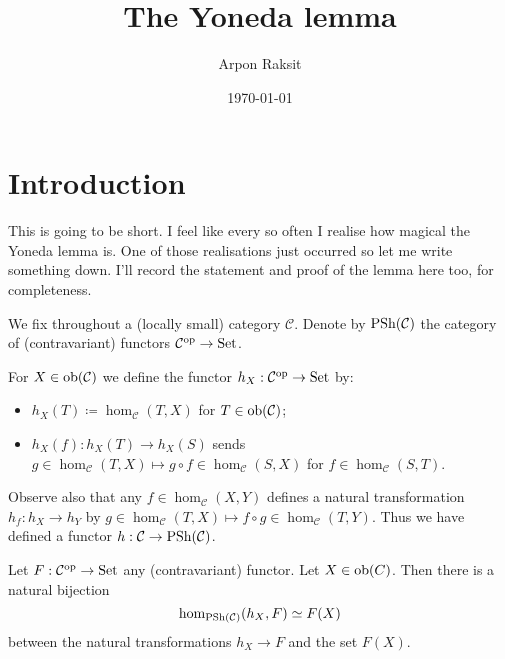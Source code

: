 


\title{The Yoneda lemma}
\author{Arpon Raksit}
\date{\today}


\maketitle
\thispagestyle{fancy}


\renewcommand{\C}{\mathcal{C}}

\section{Introduction}

This is going to be short. I feel like every so often I realise how
magical the Yoneda lemma is. One of those realisations just occurred
so let me write something down. I'll record the statement and proof of
the lemma here too, for completeness.

\begin{notation}
  We fix throughout a (locally small) category $\C$. Denote by
  $\PSh(\C)$ the category of (contravariant) functors $\C^\op \to
  \Set$.
\end{notation}

\begin{definition}
  For $X \in \ob(\C)$ we define the functor $h_X : \C^\op \to \Set$
  by:
  \begin{itemize}
  \item $h_X(T) \coloneqq \hom_\C(T,X)$ for $T \in \ob(\C)$;
  \item $h_X(f) : h_X(T) \to h_X(S)$ sends $g \in \hom_\C(T,X) \mapsto
    g \circ f \in \hom_\C(S,X)$ for $f \in \hom_\C(S,T)$.
  \end{itemize}
  Observe also that any $f \in \hom_\C(X,Y)$ defines a natural
  transformation $h_f : h_X \to h_Y$ by $g \in \hom_\C(T,X) \mapsto f
  \circ g \in \hom_\C(T,Y)$. Thus we have defined a functor $h : \C
  \to \PSh(\C)$.
\end{definition}

\begin{lemma}[Yoneda]
  Let $F : \C^\op \to \Set$ any (contravariant) functor. Let $X \in
  {\operatorname{\textup{ob}}}(C)$. Then there is a natural bijection
  \[
  \hom_{\PSh(\C)}(h_X,F) \simeq F(X)
  \]
  between the natural transformations $h_X \to F$ and the set $F(X)$.
\end{lemma}

